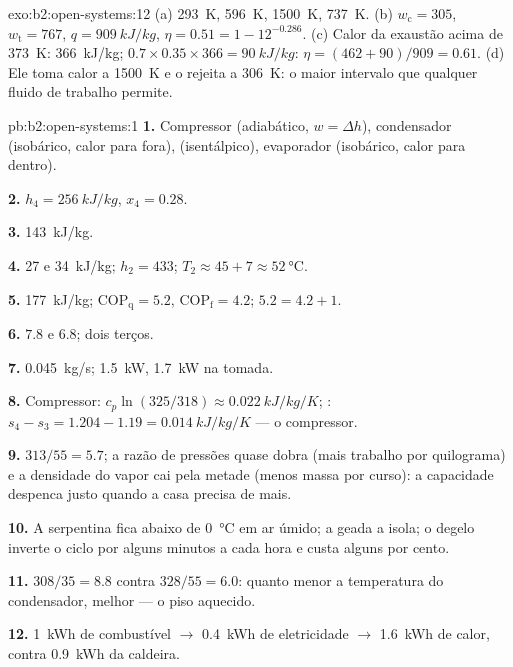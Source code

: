 \begin{solution}{exo:b2:open-systems:12}
(a) \qty{293}{K}, \qty{596}{K}, \qty{1500}{K}, \qty{737}{K}. (b) $w_{\text{c}} = 305$,
$w_{\text{t}} = 767$, $q = \qty{909}{kJ/kg}$, $\eta = 0.51 = 1 - 12^{-0.286}$. (c)
Calor da exaustão acima de \qty{373}{K}: \qty{366}{kJ/kg}; $0.7 \times 0.35 \times 366 =
\qty{90}{kJ/kg}$: $\eta = (462 + 90)/909 = 0.61$. (d) Ele toma calor a
\qty{1500}{K} e o rejeita a \qty{306}{K}: o maior intervalo que qualquer fluido
de trabalho permite.
\end{solution}

\begin{solution}{pb:b2:open-systems:1}
\textbf{1.} Compressor (adiabático, $w = \Delta h$), condensador (isobárico, calor
para fora),  (isentálpico), evaporador (isobárico, calor para dentro).

\textbf{2.} $h_4 = \qty{256}{kJ/kg}$, $x_4 = 0.28$.

\textbf{3.} \qty{143}{kJ/kg}.

\textbf{4.} \qty{27}{} e \qty{34}{kJ/kg}; $h_2 = 433$; $T_2 \approx 45 + 7 \approx
\qty{52}{\celsius}$.

\textbf{5.} \qty{177}{kJ/kg}; $\mathrm{COP}_{\text{q}} = 5.2$, $\mathrm{COP}_{\text{f}} = 4.2$;
$5.2 = 4.2 + 1$.

\textbf{6.} $7.8$ e $6.8$; dois terços.

\textbf{7.} \qty{0.045}{kg/s}; \qty{1.5}{kW}, \qty{1.7}{kW} na tomada.

\textbf{8.} Compressor: $c_p\ln(325/318) \approx \qty{0.022}{kJ/kg/K}$;
: $s_4 - s_3 = 1.204 - 1.19 = \qty{0.014}{kJ/kg/K}$ --- o compressor.

\textbf{9.} $313/55 = 5.7$; a razão de pressões quase dobra (mais trabalho
por quilograma) e a densidade do vapor cai pela metade (menos massa por curso):
a capacidade despenca justo quando a casa precisa de mais.

\textbf{10.} A serpentina fica abaixo de \qty{0}{\celsius} em ar úmido; a geada
a isola; o degelo inverte o ciclo por alguns minutos a cada hora e
custa alguns por cento.

\textbf{11.} $308/35 = 8.8$ contra $328/55 = 6.0$: quanto menor a
temperatura do condensador, melhor --- o piso aquecido.

\textbf{12.} \qty{1}{kWh} de combustível $\to$ \qty{0.4}{kWh} de eletricidade $\to$
\qty{1.6}{kWh} de calor, contra \qty{0.9}{kWh} da caldeira.


\end{solution}
